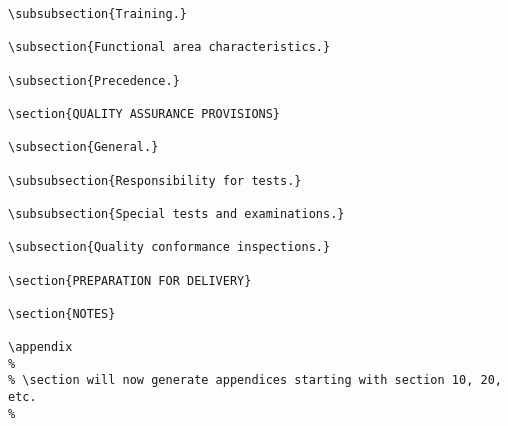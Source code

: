 \begin{itemize}
\begin{small}
\begin{verbatim}
\subsubsection{Training.}

\subsection{Functional area characteristics.}

\subsection{Precedence.}

\section{QUALITY ASSURANCE PROVISIONS}

\subsection{General.}

\subsubsection{Responsibility for tests.}

\subsubsection{Special tests and examinations.}

\subsection{Quality conformance inspections.}

\section{PREPARATION FOR DELIVERY}

\section{NOTES}

\appendix
%
% \section will now generate appendices starting with section 10, 20, etc.
%

\end{verbatim}
\end{small}
\end{itemize}
